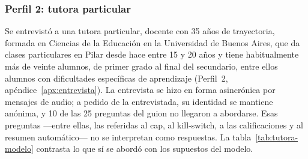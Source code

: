 \subsubsection{Perfil 2: tutora particular}

Se entrevistó a una tutora particular, docente con 35 años de trayectoria, formada en
Ciencias de la Educación en la Universidad de Buenos Aires, que da clases
particulares en Pilar desde hace entre 15 y 20 años y tiene habitualmente
más de veinte alumnos, de primer grado al final del secundario, entre
ellos alumnos con dificultades específicas de aprendizaje
(Perfil~2, apéndice~\ref{apx:entrevista}). La entrevista se hizo en forma
asincrónica por mensajes de audio; a pedido de la entrevistada, su identidad
se mantiene anónima, y 10 de las 25 preguntas del guion
no llegaron a abordarse. Esas preguntas ---entre ellas, las referidas al
\gls{cap}, al kill-switch, a las calificaciones y al resumen
automático--- no se interpretan como respuestas. La
tabla~\ref{tab:tutora-modelo} contrasta lo que sí se abordó con los
supuestos del modelo.

